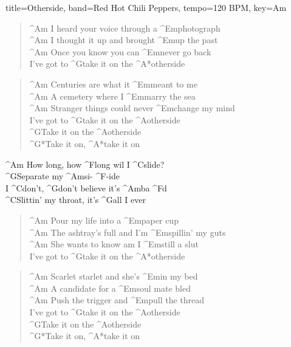 \documentclass[titlepage]{article}
\begin{document}
\begin{song}{title=Otherside, band=Red Hot Chili Peppers, tempo=120 BPM, key=Am}
	\begin{verse}
		^{Am}{ } I heard your voice through a ^{Em}photograph \\
		^{Am}{ } I thought it up and brought ^{Em}up the past \\
		^{Am}{ } Once you know you can ^{Em}never go back \\
		I've got to ^{G}take it on the ^{A*}otherside
	\end{verse}

	\begin{verse}
		^{Am}{ } Centuries are what it ^{Em}meant to me \\
		^{Am}{ } A cemetery where I ^{Em}marry the sea \\
		^{Am}{ } Stranger things could never ^{Em}change my mind \\
		I've got to ^{G}take it on the ^{A}otherside \\
		^{G}Take it on the ^{A}otherside \\
		^{G*}Take it on, ^{A*}take it on \\
	\end{verse}

	\begin{chorus}
		^{Am}{ } How long, how ^{F}long wil I ^{C}slide? \\
		^{G}Separate my ^{Am}si- ^{F}-ide \\
		I ^{C}don't, ^{G}don't believe it's ^{Am}ba ^{F}d \\
		^{C}Slittin' my throat, it's ^{G}all I ever
	\end{chorus}

	\begin{verse}
		^{Am}{ } Pour my life into a ^{Em}paper cup \\
		^{Am}{ } The ashtray's full and I'm ^{Em}spillin' my guts \\
		^{Am}{ } She wants to know am I ^{Em}still a slut \\
		I've got to ^{G}take it on the ^{A*}otherside
	\end{verse}

	\begin{verse}
		^{Am}{ } Scarlet starlet and she's ^{Em}in my bed \\
		^{Am}{ } A candidate for a ^{Em}soul mate bled \\
		^{Am}{ } Push the trigger and ^{Em}pull the thread \\
		I've got to ^{G}take it on the ^{A}otherside \\
		^{G}Take it on the ^{A}otherside \\
		^{G*}Take it on, ^{A*}take it on \\
	\end{verse}


\end{song}
\end{document}
